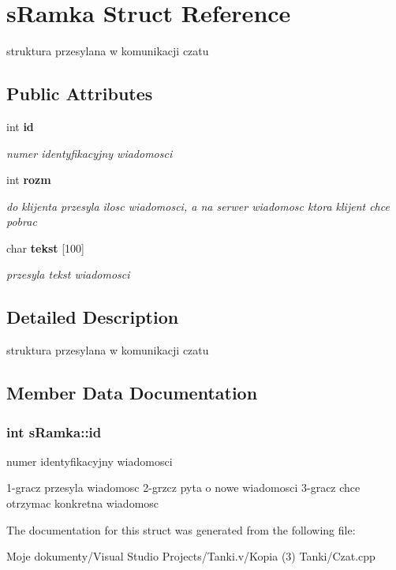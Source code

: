\section{sRamka Struct Reference}
\label{structs_ramka}
struktura przesylana w komunikacji czatu  


\subsection*{Public Attributes}
\begin{CompactItemize}
\item 
int {\bf id}
\begin{CompactList}\small\item\em numer identyfikacyjny wiadomosci \item\end{CompactList}\item 
int {\bf rozm}\label{structs_ramka_699497d5716bc0c4efb8ff1cc5d1efbc}

\begin{CompactList}\small\item\em do klijenta przesyla ilosc wiadomosci, a na serwer wiadomosc ktora klijent chce pobrac \item\end{CompactList}\item 
char {\bf tekst} [100]\label{structs_ramka_19f50d72f991dbb04c2568ca21620126}

\begin{CompactList}\small\item\em przesyla tekst wiadomosci \item\end{CompactList}\end{CompactItemize}


\subsection{Detailed Description}
struktura przesylana w komunikacji czatu 



\subsection{Member Data Documentation}
\subsubsection{\setlength{\rightskip}{0pt plus 5cm}int {\bf sRamka::id}}\label{structs_ramka_5b01fac6b32934db9b735628cecd0094}


numer identyfikacyjny wiadomosci 

1-gracz przesyla wiadomosc 2-grzcz pyta o nowe wiadomosci 3-gracz chce otrzymac konkretna wiadomosc 

The documentation for this struct was generated from the following file:\begin{CompactItemize}
\item 
Moje dokumenty/Visual Studio Projects/Tanki.v/Kopia (3) Tanki/Czat.cpp\end{CompactItemize}
